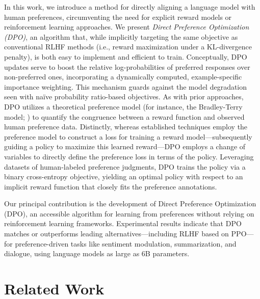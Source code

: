 In this work, we introduce a method for directly aligning a language model with human preferences, circumventing the need for explicit reward models or reinforcement learning approaches. We present \textit{{Direct Preference Optimization} (DPO)}, an algorithm that, while implicitly targeting the same objective as conventional RLHF methods (i.e., reward maximization under a KL-divergence penalty), is both easy to implement and efficient to train. Conceptually, DPO updates serve to boost the relative log-probabilities of preferred responses over non-preferred ones, incorporating a dynamically computed, example-specific importance weighting. This mechanism guards against the model degradation seen with naïve probability ratio-based objectives. As with prior approaches, DPO utilizes a theoretical preference model (for instance, the Bradley-Terry model; \cite{bradley1952rankanalysis}) to quantify the congruence between a reward function and observed human preference data. Distinctly, whereas established techniques employ the preference model to construct a loss for training a reward model—subsequently guiding a policy to maximize this learned reward—DPO employs a change of variables to directly define the preference loss in terms of the policy. Leveraging datasets of human-labeled preference judgments, DPO trains the policy via a binary cross-entropy objective, yielding an optimal policy with respect to an implicit reward function that closely fits the preference annotations.

Our principal contribution is the development of Direct Preference Optimization (DPO), an accessible algorithm for learning from preferences without relying on reinforcement learning frameworks. Experimental results indicate that DPO matches or outperforms leading alternatives—including RLHF based on PPO—for preference-driven tasks like sentiment modulation, summarization, and dialogue, using language models as large as 6B parameters.

\section{Related Work}

